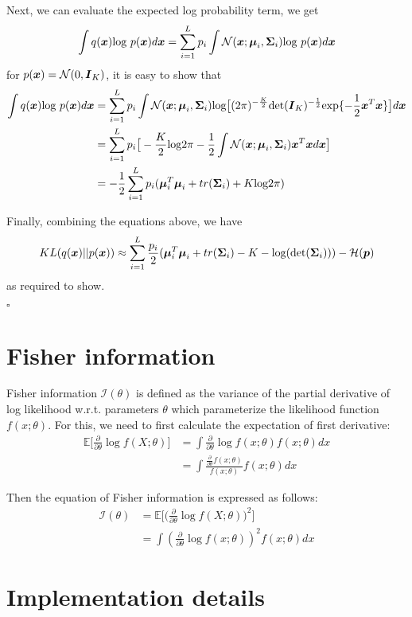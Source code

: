 Next, we can evaluate the expected log probability term, we get 
\[
\int q(\boldsymbol x) \text{log }p(\boldsymbol x) d\boldsymbol x = \sum_{i=1}^{L}p_{i}\int \mathcal N(\boldsymbol x; \boldsymbol \mu_{i}, \boldsymbol \Sigma_{i})\text{log }p(\boldsymbol x) d\boldsymbol x
\]
for $p(\boldsymbol x) = \mathcal N(0, \boldsymbol I_{K})$, it is easy to show that
\[
\begin{aligned}
\int q(\boldsymbol x) \text{log }p(\boldsymbol x) d\boldsymbol x &= \sum_{i=1}^{L}p_{i} \int 
\mathcal N(\boldsymbol x; \boldsymbol \mu_{i}, \boldsymbol \Sigma_{i}) \text{log}\big[(2\pi)^{-\frac{K}{2}} \text{det}(\boldsymbol I_{K})^{-\frac{1}{2}} \text{exp}\{-\frac{1}{2}\boldsymbol x^{T} \boldsymbol x \} \big] d\boldsymbol x \\ 
&= \sum_{i=1}^{L}p_{i} \big[
-\frac{K}{2} \text{log} 2\pi
-\frac{1}{2}\int \mathcal N(\boldsymbol x; \boldsymbol \mu_{i}, \boldsymbol \Sigma_{i}) \boldsymbol x^{T} \boldsymbol x d\boldsymbol x
\big]\\
&=-\frac{1}{2}\sum_{i=1}^{L}p_{i}(\boldsymbol \mu_{i}^{T} \boldsymbol \mu_{i} + tr(\boldsymbol \Sigma_{i}) + K\text{log}2\pi)
\end{aligned}
\]

Finally, combining the equations above, we have 
\[ 
KL(q(\boldsymbol x) || p(\boldsymbol x)) \approx \sum_{i=1}^{L}\frac{p_{i}}{2}(\boldsymbol \mu_{i}^{T} \boldsymbol \mu_{i} + tr(\boldsymbol \Sigma_{i}) - K - \text{log}(\text{det}(\boldsymbol \Sigma_{i}))) - \mathcal H (\boldsymbol p)
\] 
as required to show.  
\begin{flushright}
	$\square$
\end{flushright}
\section{Fisher information} \label{appendix:fisher_matrix}
Fisher information $\mathcal{I}(\theta)$ is defined as the variance of the partial derivative of log likelihood w.r.t. parameters $\theta$ which parameterize the likelihood function $f(x; \theta)$. For this, we need to first calculate the expectation of first derivative:
\begin{equation}
\begin{aligned}
\mathbb{E}\big[\frac{\partial}{\partial \theta} \log{f(X;\theta)} \big] &= \int \frac{\partial}{\partial \theta}\log{f(x; \theta)} f(x;\theta) dx \\
&= \int \frac{\frac{\partial}{\partial \theta}f(x;\theta)}{f(x; \theta)} f(x;\theta) dx 
\end{aligned}
\end{equation}

Then the equation of Fisher information is expressed as follows:
\begin{equation}
\begin{aligned}
\mathcal{I}(\theta) &= \mathbb{E}\big[ 
\big( 
\frac{\partial}{\partial \theta} \log{f(X;\theta)}
\big)^2
\big] \\
&= \int (\frac{\partial}{\partial \theta}\log{f(x; \theta)})^2 f(x;\theta) dx
\end{aligned}
\end{equation}



\section{Implementation details}


